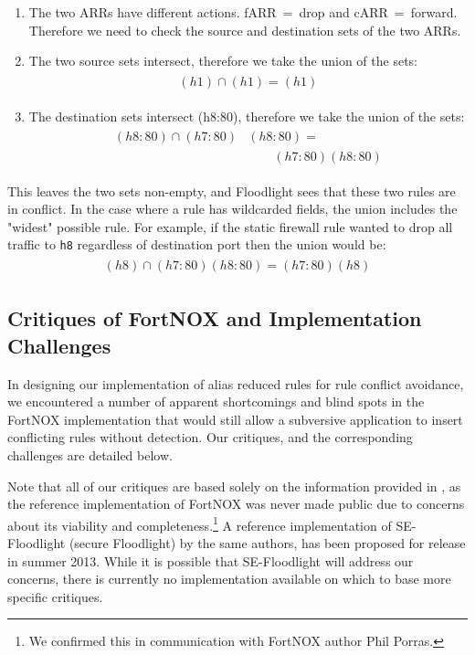 \begin{enumerate}
\item The two ARRs have different actions. \mbox{fARR = drop} and \mbox{cARR = forward}. Therefore we need to check the source and destination sets of the two ARRs.
\item The two source sets intersect, therefore we take the union of the sets:
\begin{align}
\begin{aligned}
(h1) \cap (h1) = (h1) \nonumber
\end{aligned}
\end{align}
\item The destination sets intersect (h8:80), therefore we take the union of the sets:
\begin{align}
\begin{aligned}
(h8:80) \cap (h7:80)&(h8:80) = \\
        & \qquad (h7:80) (h8:80) \nonumber
\end{aligned}
\end{align}
\end{enumerate} 

This leaves the two sets non-empty, and Floodlight sees that these two rules are in conflict.
In the case where a rule has wildcarded fields, the union includes the "widest" possible rule.
For example, if the static firewall rule wanted to drop all traffic to \texttt{h8} regardless of destination port then the union would be:
\begin{align}
\begin{aligned}
(h8) \cap (h7:80) (h8:80) =  (h7:80) (h8) \nonumber
\end{aligned}
\end{align}


\subsection{Critiques of FortNOX and Implementation Challenges}
\label{subsec:critique}
In designing our implementation of alias reduced rules for rule conflict avoidance, we encountered a number of apparent shortcomings and blind spots in the FortNOX implementation that would still allow a subversive application to insert conflicting rules without detection. Our critiques, and the corresponding challenges are detailed below.

Note that all of our critiques are based solely on the information provided in \cite{Porras:2012:SEK:2342441.2342466}, as the reference implementation of FortNOX was never made public due to concerns about its viability and completeness.\footnote{We confirmed this in communication with FortNOX author Phil Porras.} A reference implementation of SE-Floodlight (secure Floodlight) by the same authors, has been proposed for release in summer 2013. While it is possible that SE-Floodlight will address our concerns, there is currently no implementation available on which to base more specific critiques.

